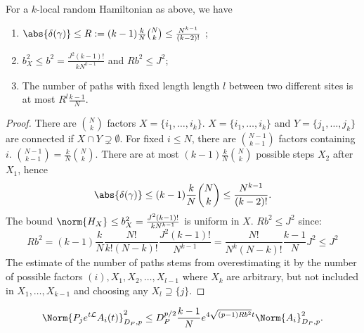 \begin{lem}[]
    For a \( k \)-local random Hamiltonian as above, we have 
    \begin{enumerate}[1)]
      \item \( \abs{\delta(\gamma)} \leq R:= (k-1)\frac{k}{N}  \binom{N}{k} \leq \frac{N^{k-1}}{(k-2)!} \) ; 
      \item \( b_X^{2} \leq b^{2} = \frac{J^{2}(k-1)!}{kN^{k-1}} \) and \( Rb^{2}\leq J^{2} \);
      \item The number of paths with fixed length length \( l \) between two different sites is at most \( R^{l} \frac{k-1}{N} \).
    \end{enumerate}
    
\end{lem}
\begin{proof}
  There are \( \binom{N}{k} \) factors \( X=\{i_1, \dots, i_k\} \). \( X=\{i_1,\dots,i_k\} \) and \( Y= \{j_1, \dots, j_k\} \) are connected if \( X \cap Y \supsetneq \emptyset  \). For fixed \( i \leq N \), there are \( \binom{N-1}{k-1} \) factors containing \( i \). \( \binom{N-1}{k-1} = \frac{k}{N} \binom{N}{k}\). There are at most \( (k-1)\frac{k}{N}\binom{N}{k} \) possible steps \( X_2 \) after \( X_1 \), hence
  \[ \abs{\delta(\gamma )} \leq (k-1) \frac{k}{N} \binom{N}{k}  \leq \frac{N^{k-1}}{(k-2)!}.\]
  The bound \( \norm{H_X}_{} \leq  b_X^{2} = \frac{J^{2}(k-1)!}{kN^{k-1}} \) is uniform in \( X \). 
  \( Rb^{2} \leq J^{2} \) since: 
  \[ Rb^{2} = (k-1)\frac{k}{N} \frac{N!}{k!(N-k)!} \frac{J^{2}(k-1)!}{N^{k-1}} = \frac{N!}{N^{k}(N-k)!} \frac{k-1}{N}J^{2} \leq J^{2} \] 
  The estimate of the number of paths stems from overestimating it by the number of possible factors \( (i), X_1, X_2,\dots, X_{l-1} \) where \( X_k \) are arbitrary, but not included in \( X_1,\dots, X_{k-1} \) and choosing any \( X_l \supseteq \{j\}\). 
\end{proof}




\begin{lem}[]
  \[ \Norm{P_j e^{t \mathcal{L}} A_i(t)}_{D_P,p}^{2} \leq D_{P}^{p/2} \frac{k-1}{N} e^{4 \sqrt{(p-1) Rb^{2}}t} \Norm{A_i}_{D_P,p}^{2}. \]
\end{lem}

